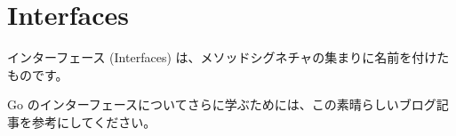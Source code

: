 \section{Interfaces}

インターフェース (Interfaces) は、メソッドシグネチャの集まりに名前を付けたものです。




Go のインターフェースについてさらに学ぶためには、この素晴らしいブログ記事を参考にしてください。